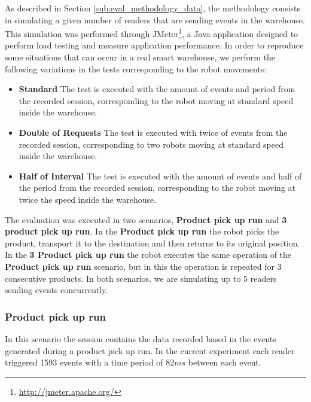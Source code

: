 As described in Section \ref{sub:eval_methodology_data}, the methodology consists in simulating a given
number of readers that are sending events in the warehouse. This simulation was performed through
JMeter\footnote{\url{http://jmeter.apache.org/}}, a Java application designed to perform load testing
and measure application performance. In order to reproduce some situations that can occur in a real
smart warehouse, we perform the following variations in the tests corresponding to the robot movements:

\begin{itemize}
  \item\textbf{Standard} The test is executed with the amount of events and period from the recorded
  session, corresponding to the robot moving at standard speed inside the warehouse.
  \item\textbf{Double of Requests} The test is executed with twice of events from the recorded session,
  corresponding to two robots moving at standard speed inside the warehouse.
  \item\textbf{Half of Interval} The test is executed with the amount of events and half of the period from
  the recorded session, corresponding to the robot moving at twice the speed inside the warehouse.
\end{itemize}

The evaluation was executed in two scenarios, \textbf{Product pick up run} and \textbf{3 product pick up run}.
In the \textbf{Product pick up run} the robot picks the product, transport it to the destination
and then returns to its original position. In the \textbf{3 Product pick up run} the robot executes
the same operation of the \textbf{Product pick up run} scenario, but in this the operation is repeated
for 3 consecutive products. In both scenarios, we are simulating up to 5 readers sending events
concurrently.

\subsubsection{Product pick up run}
\label{subs:eval_exp_data_baseline}
In this scenario the session contains the data recorded based in the events generated during a product
pick up run. In the current experiment each reader triggered 1593 events with a time period of 82$ms$
between each event.\\

